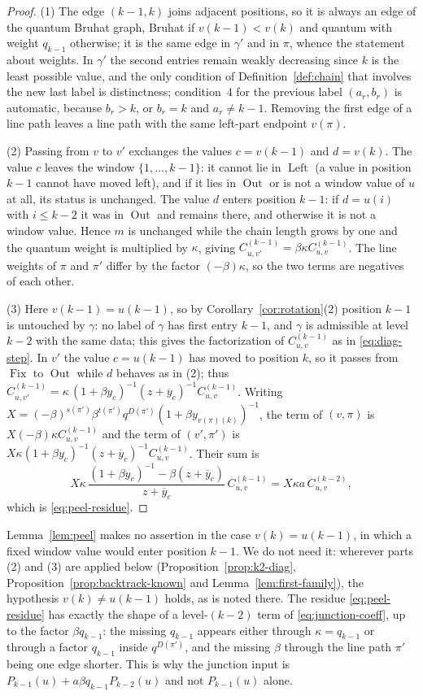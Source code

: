 \documentclass[11pt]{article}
\newcommand{\Fix}{\operatorname{Fix}}
\newcommand{\Left}{\operatorname{Left}}
\newcommand{\Out}{\operatorname{Out}}
\begin{document}
\begin{proof}
(1) The edge $(k-1,k)$ joins adjacent positions, so it is always an
edge of the quantum Bruhat graph, Bruhat if $v(k-1)<v(k)$ and quantum
with weight $q_{k-1}$ otherwise; it is the same edge in $\gamma'$ and
in $\pi$, whence the statement about weights. In $\gamma'$ the second
entries remain weakly decreasing since $k$ is the least possible
value, and the only condition of Definition~\ref{def:chain} that
involves the new last label is distinctness; condition~4 for the
previous label $(a_r,b_r)$ is automatic, because $b_r>k$, or $b_r=k$
and $a_r\neq k-1$. Removing the first edge of a line path leaves a
line path with the same left-part endpoint $v(\pi)$.

(2) Passing from $v$ to $v'$ exchanges the values $c=v(k-1)$ and
$d=v(k)$. The value $c$ leaves the window $\{1,\ldots,k-1\}$: it
cannot lie in $\Left$ (a value in position $k-1$ cannot have moved
left), and if it lies in $\Out$ or is not a window value of $u$ at
all, its status is unchanged. The value $d$ enters position $k-1$:
if $d=u(i)$ with $i\leq k-2$ it was in $\Out$ and remains there, and
otherwise it is not a window value. Hence $m$ is unchanged while the
chain length grows by one and the quantum weight is multiplied by
$\kappa$, giving $C^{(k-1)}_{u,v'}=\beta\kappa C^{(k-1)}_{u,v}$. The
line weights of $\pi$ and $\pi'$ differ by the factor $(-\beta)\kappa$,
so the two terms are negatives of each other.

(3) Here $v(k-1)=u(k-1)$, so by Corollary~\ref{cor:rotation}(2)
position $k-1$ is untouched by $\gamma$: no label of
$\gamma$ has first entry $k-1$, and $\gamma$ is admissible at level
$k-2$ with the same data; this gives the factorization of
$C^{(k-1)}_{u,v}$ as in \eqref{eq:diag-step}. In $v'$ the value
$c=u(k-1)$ has moved to position $k$, so it passes from $\Fix$ to
$\Out$ while $d$ behaves as in (2); thus
$C^{(k-1)}_{u,v'}=\kappa\,(1+\beta y_c)^{-1}(z+\overline y_c)^{-1}C^{(k-1)}_{u,v}$.
Writing $X=(-\beta)^{s(\pi')}\beta^{t(\pi')}q^{D(\pi')}(1+\beta y_{v(\pi)(k)})^{-1}$,
the term of $(v,\pi)$ is $X(-\beta)\kappa C^{(k-1)}_{u,v}$ and the term
of $(v',\pi')$ is $X\kappa(1+\beta y_c)^{-1}(z+\overline y_c)^{-1}C^{(k-1)}_{u,v}$.
Their sum is
\[
 X\kappa\,\frac{(1+\beta y_c)^{-1}-\beta(z+\overline y_c)}{z+\overline y_c}\,
   C^{(k-1)}_{u,v}
 =X\kappa a\,C^{(k-2)}_{u,v},
\]
which is \eqref{eq:peel-residue}.
\end{proof}

Lemma~\ref{lem:peel} makes no assertion in the case $v(k)=u(k-1)$,
in which a fixed window value would enter position $k-1$. We do not
need it: wherever parts (2) and (3) are applied below
(Proposition~\ref{prop:k2-diag}, Proposition~\ref{prop:backtrack-known}
and Lemma~\ref{lem:first-family}), the hypothesis $v(k)\neq u(k-1)$
holds, as is noted there. The residue
\eqref{eq:peel-residue} has exactly the shape of a level-$(k-2)$ term
of \eqref{eq:junction-coeff}, up to the factor $\beta q_{k-1}$: the
missing $q_{k-1}$ appears either through $\kappa=q_{k-1}$ or through a
factor $q_{k-1}$ inside $q^{D(\pi')}$, and the missing $\beta$ through
the line path $\pi'$ being one edge shorter. This is why the junction input
is $P_{k-1}(u)+a\beta q_{k-1}P_{k-2}(u)$ and not $P_{k-1}(u)$ alone.
\end{document}
